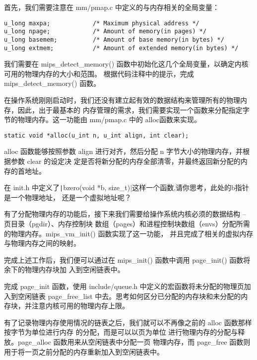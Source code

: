 首先，我们需要注意在 mm/pmap.c 中定义的与内存相关的全局变量：

\begin{verbatim}
u_long maxpa;            /* Maximum physical address */
u_long npage;            /* Amount of memory(in pages) */
u_long basemem;          /* Amount of base memory(in bytes) */
u_long extmem;           /* Amount of extended memory(in bytes) */
\end{verbatim}

\begin{exercise}
我们需要在 mips\_detect\_memory() 函数中初始化这几个全局变量，以确定内核可用的物理内存的大小和范围。
根据代码注释中的提示，完成 mips\_detect\_memory() 函数。
\end{exercise}

在操作系统刚刚启动时，我们还没有建立起有效的数据结构来管理所有的物理内存，因此，出于最基本的
内存管理的需求，我们需要实现一个函数来分配指定字节的物理内存。这一功能由 mm/pmap.c 中的
alloc函数来实现。

\begin{verbatim}
static void *alloc(u_int n, u_int align, int clear);
\end{verbatim}

alloc 函数能够按照参数 align 进行对齐，然后分配 n 字节大小的物理内存，并根据参数 clear 的设定决
定是否将新分配的内存全部清零，并最终返回新分配的内存的首地址。

\begin{thinking}\label{think-bzero}
在 init.h 中定义了\texttt|bzero(void *b, size_t)|这样一个函数,请你思考，此处的b指针是一个物理地址，
还是一个虚拟地址呢？ 
\end{thinking}

有了分配物理内存的功能后，接下来我们需要给操作系统内核必须的数据结构 -- 页目录（pgdir）、内存控制块
数组（pages）和进程控制块数组（envs）分配所需的物理内存。mips\_vm\_init() 函数实现了这一功能，
并且完成了相关的虚拟内存与物理内存之间的映射。

完成上述工作后，我们便可以通过在 mips\_init() 函数中调用 page\_init() 函数将余下的物理内存块加
入到空闲链表中。

\begin{exercise}
完成 page\_init 函数，使用 include/queue.h 中定义的宏函数将未分配的物理页加入到空闲链表
page\_free\_list 中去。思考如何区分已分配的内存块和未分配的内存块，并注意内核可用的物理内存上限。
\end{exercise}

有了记录物理内存使用情况的链表之后，我们就可以不再像之前的 alloc 函数那样按字节为单位进行内存
的分配，而是可以以页为单位 进行物理内存的分配与释放。page\_alloc 函数用来从空闲链表中分配一页
物理内存，而 page\_free 函数则用于将一页之前分配的内存重新加入到空闲链表中。

